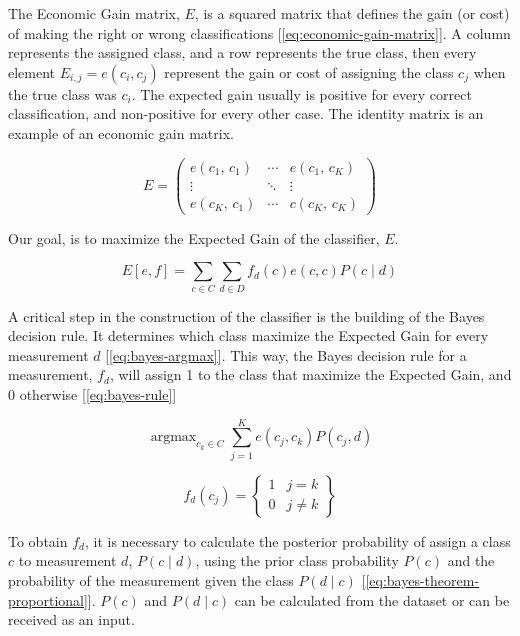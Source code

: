 \documentclass[letterpaper, conference]{IEEEtran}
\DeclareMathOperator*{\argmax}{argmax}
\begin{document}
The Economic Gain matrix, $E$, is a squared matrix that defines the gain (or cost) of making the right or wrong classifications [\ref{eq:economic-gain-matrix}]. A column represents the assigned class, and a row represents the true class, then every element $E_{i, j} = e(c_i, c_j)$ represent the gain or cost of assigning the class $c_j$ when the true class was $c_i$. The expected gain usually is positive for every correct classification, and non-positive for every other case. The identity matrix is an example of an economic gain matrix.

\begin{equation}\label{eq:economic-gain-matrix}
  E = \begin{pmatrix}
    e(c_1,\,c_1) & \cdots & e(c_1,\,c_K) \\
      \vdots   & \ddots &    \vdots   \\
    e(c_K,\,c_1) & \cdots & c(c_K,\,c_K)
  \end{pmatrix}
\end{equation}

Our goal, is to maximize the Expected Gain of the classifier, $E$.

\begin{equation}
  E[e, f] = \sum_{c \in C} \sum_{d \in D}f_d(c)\mathbin{}e(c, c)\mathbin{}P(c \mid d)
\end{equation}

A critical step in the construction of the classifier is the building of the Bayes decision rule. It determines which class maximize the Expected Gain for every measurement $d$ [\ref{eq:bayes-argmax}]. This way, the Bayes decision rule for a measurement, $f_d$, will assign 1 to the class that maximize the Expected Gain, and 0 otherwise [\ref{eq:bayes-rule}]

\begin{equation}\label{eq:bayes-argmax}
  \argmax_{c_k \in C} \sum_{j = 1}^{K} e(c_j, c_k)\mathbin{}P(c_j, d)
\end{equation}

\begin{equation}\label{eq:bayes-rule}
  f_d(c_j) = \left\{
  \begin{array}{lr}
  1 & j = k\\
  0 & j \neq k
  \end{array}\right\}
\end{equation}

To obtain $f_d$, it is necessary to calculate the posterior probability of assign a class $c$ to measurement $d$, $P(c \mid d)$, using the prior class probability $P(c)$ and the probability of the measurement given the class $P(d \mid c)$ [\ref{eq:bayes-theorem-proportional}]. $P(c)$ and $P(d \mid c)$ can be calculated from the dataset or can be received as an input.
\end{document}

